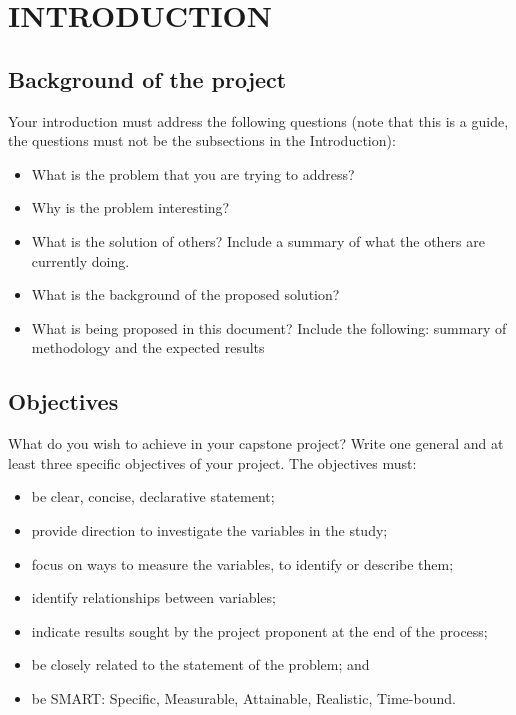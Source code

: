 \section{INTRODUCTION}
    \subsection{Background of the project}
            Your introduction must address the following questions (note that this is a guide, the questions must not be the subsections in the Introduction):
            \begin{itemize}
                \item What is the problem that you are trying to address? 
                \item Why is the problem interesting?
                \item What is the solution of others? Include a summary of what the others are currently doing.
                \item What is the background of the proposed solution?
                \item What is being proposed in this document? Include the following: summary of methodology and the expected results
            \end{itemize}
        \lipsum[4]
    \subsection{Objectives}
        What do you wish to achieve in your capstone project? Write one general and at least three specific objectives of your project. The objectives must:
            \begin{itemize}
                \item be clear, concise, declarative statement;
                \item provide direction to investigate the variables in the study;  
                \item focus on ways to measure the variables, to identify or describe them;
                \item identify relationships between variables;
                \item indicate results sought by the project proponent at the end of the process;
                \item be closely related to the statement of the problem; and
                \item be SMART: Specific, Measurable, Attainable, Realistic, Time-bound.
            \end{itemize}
